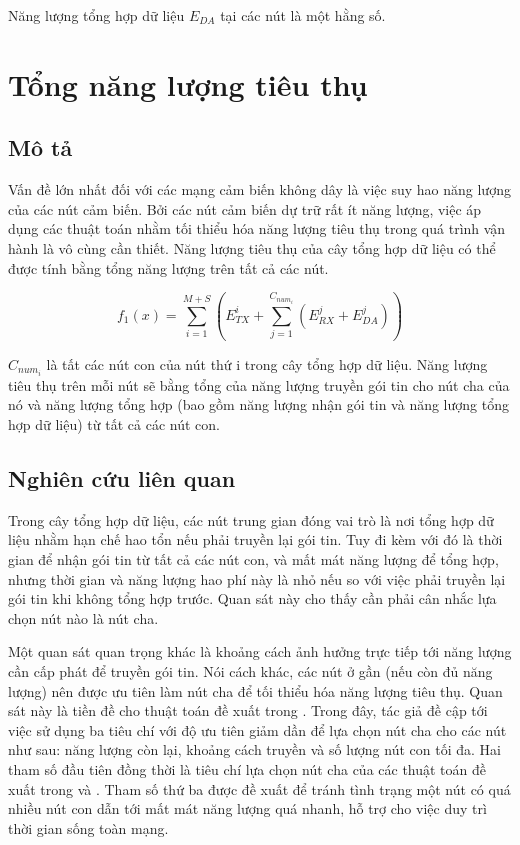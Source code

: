 Năng lượng tổng hợp dữ liệu $E_{DA}$ tại các nút là một hằng số.

\section{Tổng năng lượng tiêu thụ}
\subsection{Mô tả}
Vấn đề lớn nhất đối với các mạng cảm biến không dây là việc suy hao năng lượng của các nút cảm biến. Bởi các nút cảm biến dự trữ rất ít năng lượng, việc áp dụng các thuật toán nhằm tối thiểu hóa năng lượng tiêu thụ trong quá trình vận hành là vô cùng cần thiết. Năng lượng tiêu thụ của cây tổng hợp dữ liệu có thể được tính bằng tổng năng lượng trên tất cả các nút.

\begin{equation}
f_1(x) = \sum_{i=1}^{M + S} (E^i_{TX} + \sum_{j=1}^{C_{num_i}} (E_{RX}^j + E_{DA}^j))
\end{equation}

$C_{num_i}$ là tất các nút con của nút thứ i trong cây tổng hợp dữ liệu. Năng lượng tiêu thụ trên mỗi nút sẽ bằng tổng của năng lượng truyền gói tin cho nút cha của nó và năng lượng tổng hợp (bao gồm năng lượng nhận gói tin và năng lượng tổng hợp dữ liệu) từ tất cả các nút con.
\subsection{Nghiên cứu liên quan}
Trong cây tổng hợp dữ liệu, các nút trung gian đóng vai trò là nơi tổng hợp dữ liệu nhằm hạn chế hao tổn nếu phải truyền lại gói tin. Tuy đi kèm với đó là thời gian để nhận gói tin từ tất cả các nút con, và mất mát năng lượng để tổng hợp, nhưng thời gian và năng lượng hao phí này là nhỏ nếu so với việc phải truyền lại gói tin khi không tổng hợp trước. Quan sát này cho thấy cần phải cân nhắc lựa chọn nút nào là nút cha.


Một quan sát quan trọng khác là khoảng cách ảnh hưởng trực tiếp tới năng lượng cần cấp phát để truyền gói tin. Nói cách khác, các nút ở gần (nếu còn đủ năng lượng) nên được ưu tiên làm nút cha để tối thiểu hóa năng lượng tiêu thụ. Quan sát này là tiền đề cho thuật toán đề xuất trong \cite{eskandari2008energy}. Trong đây, tác giả đề cập tới việc sử dụng ba tiêu chí với độ ưu tiên giảm dần để lựa chọn nút cha cho các nút như sau: năng lượng còn lại, khoảng cách truyền và số lượng nút con tối đa. Hai tham số đầu tiên đồng thời là tiêu chí lựa chọn nút cha của các thuật toán đề xuất trong \cite{lee2005energy} và \cite{lee2005lpt}. Tham số thứ ba được đề xuất để tránh tình trạng một nút có quá nhiều nút con dẫn tới mất mát năng lượng quá nhanh, hỗ trợ cho việc duy trì thời gian sống toàn mạng.

